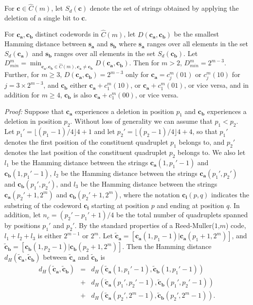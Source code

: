 For $\mathbf{c} \in \hat{C}(m)$,
let $S_d(\mathbf{c})$ denote the set of strings obtained by
applying the deletion of a single bit to $\mathbf{c}$.

\begin{lemma}\label{LE1}
For $\mathbf{c_a},\mathbf{c_b}$ distinct codewords in
$\hat{C}(m)$, let $D(\mathbf{c_a},\mathbf{c_b})$ be the smallest
Hamming distance between $\mathbf{s_a}$ and $\mathbf{s_b}$ where
$\mathbf{s_a}$ ranges over all elements in the set
$S_d(\mathbf{c_a})$ and $\mathbf{s_b}$ ranges over all elements in
the set $S_d(\mathbf{c_b})$. Let
$D_{min}^m=\min_{\mathbf{c_a},\mathbf{c_b} \in \hat{C}(m),
\mathbf{c_a}\neq \mathbf{c_b}} D(\mathbf{c_a},\mathbf{c_b})$. Then
for $m>2$, $D_{min}^m=2^{m-3}$. Further, for $m \ge 3$,
$D(\mathbf{c_a},\mathbf{c_b})=2^{m-3}$ only for
$\mathbf{c_a}=c_j^m(01)$ or $c_j^m(10)$ for $j=3 \times 2^{m-3}$,
and $\mathbf{c_b}$ either $\mathbf{c_a}+c_1^m(10)$, or
$\mathbf{c_a}+c_1^m(01)$, or vice versa, and in addition for $m
\geq 4$, $\mathbf{c_b}$ is also $\mathbf{c_a}+c_1^m(00)$, or vice
versa.
\end{lemma}
\noindent \textit{Proof:} Suppose that $\mathbf{c_a}$ experiences
a deletion in position $p_1$ and $\mathbf{c_b}$ experiences a
deletion in position $p_2$. Without loss of generality we can
assume that $p_1 <p_2$. Let $p_1'= \lfloor(p_1-1)/4 \rfloor 4+1$
and let $p_2'= \lfloor(p_2-1)/4 \rfloor 4+4$, so that $p_1'$
denotes the first position of the constituent quadruplet $p_1$
belongs to, and $p_2'$ denotes the last position of the
constituent quadruplet $p_2$ belongs to. We also let $l_1$ be the
Hamming distance between the strings $\mathbf{c_a}(1,p_1'-1)$ and
$\mathbf{c_b}(1,p_1'-1)$, $l_2$ be the Hamming distance between
the strings $\mathbf{c_a}(p_1',p_2')$ and
$\mathbf{c_b}(p_1',p_2')$, and $l_3$ be the Hamming distance
between the strings $\mathbf{c_a}(p_2'+1,2^{m})$ and
$\mathbf{c_b}(p_2'+1,2^{m})$, where the notation
$\mathbf{c_i}(p,q)$ indicates the substring of the codeword
$\mathbf{c_i}$ starting at position $p$ and ending at position
$q$. In addition, let $n_c=(p_2'-p_1'+1)/4$ be the total number of
quadruplets spanned by positions $p_1'$ and $p_2'$. By the
standard properties of a Reed-Muller($1$,$m$) code, $l_1+l_2+l_3$
is either $2^{m-1}$ or $2^m$. Let
$\mathbf{\tilde{c}_a}=[\mathbf{c_a}(1,p_1-1) |
\mathbf{c_a}(p_1+1,2^m)]$, and
$\mathbf{\tilde{c}_b}=[\mathbf{c_b}(1,p_2-1) |
\mathbf{c_b}(p_2+1,2^m)]$. Then the Hamming distance
$d_{H}(\mathbf{\tilde{c}_a},\mathbf{\tilde{c}_b})$ between
$\mathbf{\tilde{c}_a}$ and $\mathbf{\tilde{c}_b}$ is
\begin{eqnarray*}
d_{H}(\mathbf{\tilde{c}_a},\mathbf{\tilde{c}_b})&=&
d_H\left(\mathbf{\tilde{c}_a}(1,p_1'-1),\mathbf{\tilde{c}_b}(1,p_1'-1)\right)\\
{}&+&d_H\left(\mathbf{\tilde{c}_a}(p_1',p_2'-1),\mathbf{\tilde{c}_b}(p_1',p_2'-1)\right)\\
{}&+&d_H\left(\mathbf{\tilde{c}_a}(p_2',2^m-1),\mathbf{\tilde{c}_b}(p_2',2^m-1)\right).
\end{eqnarray*}

